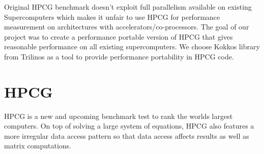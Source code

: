 \documentclass{ccr15}
\begin{document}
Original HPCG benchmark doesn't exploit full parallelism available on existing Supercomputers which makes it unfair to use HPCG for performance measurement on architectures with accelerators/co-processors.
The goal of our project was to create a performance portable version of HPCG that gives reasonable performance on all existing supercomputers. 
We choose  Kokkos\cite{ZAB:Kokkos} library from Trilinos\cite{ZAB:Trilinos} as a tool to provide performance portability in HPCG code.


\section{HPCG}

HPCG is a new and
upcoming benchmark test to rank the worlds largest computers. On top
of solving a large system of equations, HPCG also features a more irregular data access pattern
so that data access affects results as well as matrix computations.
\end{document}

